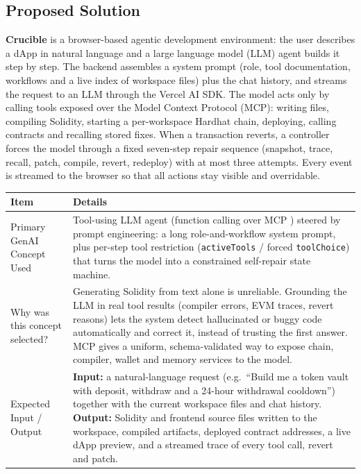\documentclass[11pt,letterpaper]{article}
\begin{document}
\subsection{Proposed Solution}
\textbf{Crucible} is a browser-based agentic development environment: the user describes a dApp in natural language and a large language model (LLM) agent builds it step by step. The backend assembles a system prompt (role, tool documentation, workflows and a live index of workspace files) plus the chat history, and streams the request to an LLM through the Vercel AI SDK. The model acts only by calling tools exposed over the Model Context Protocol (MCP): writing files, compiling Solidity, starting a per-workspace Hardhat chain, deploying, calling contracts and recalling stored fixes. When a transaction reverts, a controller forces the model through a fixed seven-step repair sequence (snapshot, trace, recall, patch, compile, revert, redeploy) with at most three attempts. Every event is streamed to the browser so that all actions stay visible and overridable.

\medskip
\begin{tabular}{|L{2.1in}|L{4.05in}|}
\hline
\textbf{Item} & \textbf{Details}\\\hline
Primary GenAI Concept Used &
  Tool-using LLM agent \cite{yao2023react,schick2023toolformer} (function calling over MCP \cite{mcpspec}) steered by prompt engineering: a long role-and-workflow system prompt, plus per-step tool restriction (\texttt{activeTools} / forced \texttt{toolChoice}) that turns the model into a constrained self-repair state machine.\\\hline
Why was this concept selected? &
  Generating Solidity from text alone is unreliable. Grounding the LLM in real tool results (compiler errors, EVM traces, revert reasons) lets the system detect hallucinated or buggy code automatically and correct it, instead of trusting the first answer. MCP gives a uniform, schema-validated way to expose chain, compiler, wallet and memory services to the model.\\\hline
Expected Input / Output &
  \textbf{Input:} a natural-language request (e.g.\ ``Build me a token vault with deposit, withdraw and a 24-hour withdrawal cooldown'') together with the current workspace files and chat history. \textbf{Output:} Solidity and frontend source files written to the workspace, compiled artifacts, deployed contract addresses, a live dApp preview, and a streamed trace of every tool call, revert and patch.\\\hline
\end{tabular}
\end{document}
